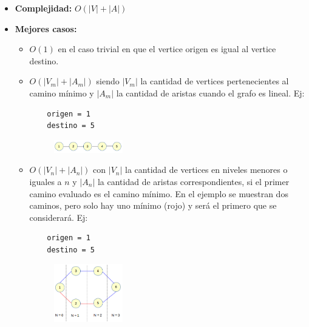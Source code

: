 \documentclass[a4paper,10pt]{article}
\begin{document}
\begin{itemize}
\item \textbf{Complejidad:} $O(|V| + |A|)$
\item \textbf{Mejores casos:}
	\begin{itemize}
	\item $O(1)$ en el caso trivial en que el vertice origen es igual al vertice destino.
	\item $O(|V_m| + |A_m|)$ siendo $|V_m|$ la cantidad de vertices pertenecientes al camino mínimo y $|A_m|$ la cantidad de aristas cuando el grafo es lineal. Ej:
	\begin{verbatim}
	origen = 1
	destino = 5
	\end{verbatim}
	\begin{figure}[H]
	\begin{center}
	\includegraphics[width=0.3\textwidth]{./g1.png}
	\label{fig:g1}
	\end{center}
	\end{figure}
	\item $O(|V_n| + |A_n|)$ con $|V_n|$ la cantidad de vertices en niveles menores o iguales a $n$ y $|A_n|$ la cantidad de aristas correspondientes, si el primer camino evaluado es el camino mínimo. En el ejemplo se muestran dos caminos, pero solo hay uno mínimo (rojo) y será el primero que se considerará. Ej:
	\begin{verbatim}
	origen = 1
	destino = 5
	\end{verbatim}
	\begin{figure}[H]
	\begin{center}
	\includegraphics[width=0.3\textwidth]{./g2.png}
	\label{fig:g2}
	\end{center}
	\end{figure}
	\end{itemize}


\end{itemize}
\end{document}
